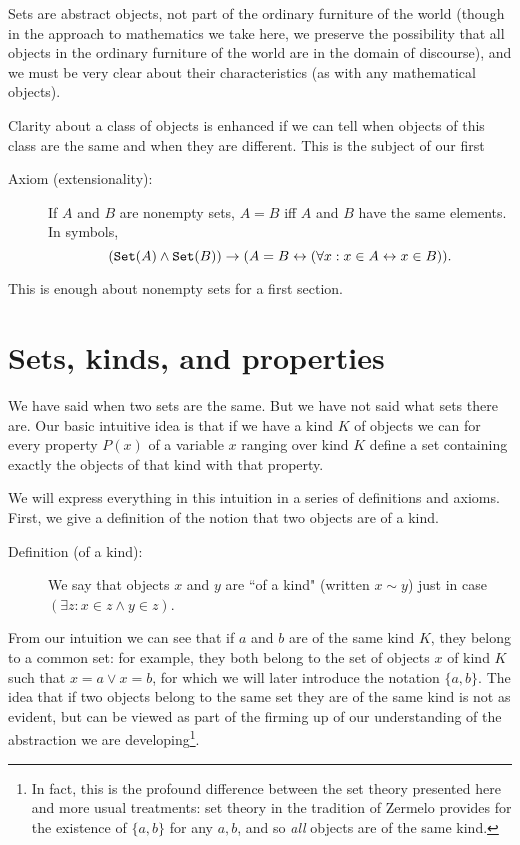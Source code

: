 \documentclass[12pt]{article}
\begin{document}
Sets are abstract objects, not part of the ordinary furniture of the world (though in the approach to mathematics we take here, we preserve the possibility that all objects in the ordinary furniture of the world are in the domain of discourse), and we must be very clear about their characteristics (as with any mathematical objects).

Clarity about a class of objects is enhanced if we can tell when objects of this class are the same and when they are different.  This is the subject of our first

\begin{description}

\item[Axiom (extensionality):]  If $A$ and $B$ are nonempty sets, $A=B$ iff $A$ and $B$ have the same elements.  In symbols, $$({\tt Set}(A) \wedge {\tt Set}(B)) \rightarrow (A = B \leftrightarrow (\forall x:x \in A \leftrightarrow x \in B)).$$

\end{description}

This is enough about nonempty sets for a first section.

\newpage

\section{Sets, kinds, and properties}

We have said when two sets are the same.  But we have not said what sets there are.   Our basic intuitive idea is that if we have a kind $K$ of objects
we can for every property $P(x)$ of a variable $x$ ranging over kind $K$ define a set containing exactly the objects of that kind with that property.

We will express everything in this intuition in a series of definitions and axioms.  First, we give a definition of the notion that two objects are of a kind.

\begin{description}

\item[Definition (of a kind):]  We say that objects $x$ and $y$ are ``of a kind" (written $x \sim y$) just in case $(\exists z:x \in z \wedge y \in z)$.

\end{description}

From our intuition we can see that if $a$ and $b$ are of the same kind $K$, they belong to a common set:  for example, they both belong to the set of objects $x$ of kind $K$ such that $x=a \vee x=b$, for which we will later introduce the notation $\{a,b\}$.  The idea that if two objects belong to the same set they are of the same kind is not as evident, but can be viewed as part of the firming up of our understanding of the abstraction we are developing\footnote{In fact, this is the profound difference between the set theory presented here and more usual treatments:  set theory in the tradition of Zermelo provides for the existence of $\{a,b\}$ for any $a,b$, and so {\em all\/} objects are of the same kind.}.
\end{document}

